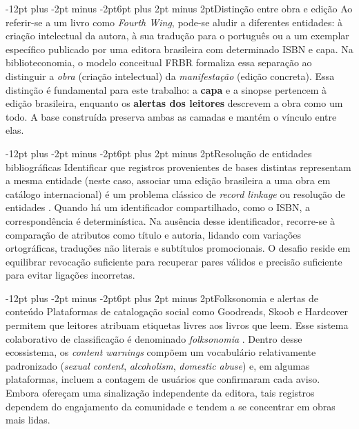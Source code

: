 \documentclass[12pt]{article}
\makeatletter
\renewcommand{\subsection}{\@startsection{subsection}{2}{\z@}%
  {-12pt plus -2pt minus -2pt}{6pt plus 2pt minus 2pt}{\normalfont\normalsize\bfseries}}
\makeatother
\begin{document}
\subsection{Distinção entre obra e edição}
Ao referir-se a um livro como \emph{Fourth Wing}, pode-se aludir a diferentes entidades: à criação intelectual da autora, à sua tradução para o português ou a um exemplar específico publicado por uma editora brasileira com determinado ISBN e capa. Na biblioteconomia, o modelo conceitual FRBR \cite{TODO-frbr} formaliza essa separação ao distinguir a \emph{obra} (criação intelectual) da \emph{manifestação} (edição concreta). Essa distinção é fundamental para este trabalho: a \textbf{capa} e a sinopse pertencem à edição brasileira, enquanto os \textbf{alertas dos leitores} descrevem a obra como um todo. A base construída preserva ambas as camadas e mantém o vínculo entre elas.

\subsection{Resolução de entidades bibliográficas}
Identificar que registros provenientes de bases distintas representam a mesma entidade (neste caso, associar uma edição brasileira a uma obra em catálogo internacional) é um problema clássico de \emph{record linkage} ou resolução de entidades \cite{TODO-record-linkage}. Quando há um identificador compartilhado, como o ISBN, a correspondência é determinística. Na ausência desse identificador, recorre-se à comparação de atributos como título e autoria, lidando com variações ortográficas, traduções não literais e subtítulos promocionais. O desafio reside em equilibrar revocação suficiente para recuperar pares válidos e precisão suficiente para evitar ligações incorretas.

\subsection{Folksonomia e alertas de conteúdo}
Plataformas de catalogação social como Goodreads, Skoob e Hardcover permitem que leitores atribuam etiquetas livres aos livros que leem. Esse sistema colaborativo de classificação é denominado \emph{folksonomia} \cite{golder2006usage}. Dentro desse ecossistema, os \emph{content warnings} compõem um vocabulário relativamente padronizado (\emph{sexual content}, \emph{alcoholism}, \emph{domestic abuse}) e, em algumas plataformas, incluem a contagem de usuários que confirmaram cada aviso. Embora ofereçam uma sinalização independente da editora, tais registros dependem do engajamento da comunidade e tendem a se concentrar em obras mais lidas.
\end{document}
